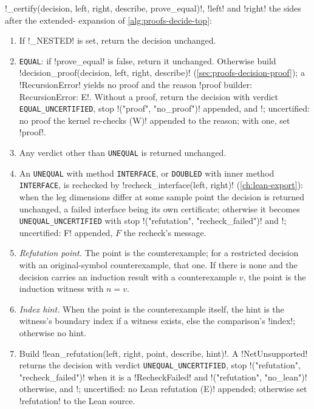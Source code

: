 \begin{algorithm}[Certification]\label{alg:proofs-certify}
\py!_certify(decision, left, right, describe, prove_equal)!, \py!left! and \py!right! the sides after the extended-\bbox{} expansion of \cref{alg:proofs-decide-top}:
\begin{enumerate}
\item If \py!_NESTED! is set, return the decision unchanged.
\item \texttt{EQUAL}: if \py!prove_equal! is false, return it unchanged. Otherwise build \py!decision_proof(decision, left, right, describe)! (\cref{sec:proofs-decision-proof}); a \py!RecursionError! yields no proof and the reason \code!proof builder: RecursionError: E!. Without a proof, return the decision with verdict \texttt{EQUAL\_UNCERTIFIED}, stop \code!("proof", "no_proof")! appended, and \code!; uncertified: no proof the kernel re-checks (W)! appended to the reason; with one, set \py!proof!.
\item Any verdict other than \texttt{UNEQUAL} is returned unchanged.
\item An \texttt{UNEQUAL} with method \texttt{INTERFACE}, or \texttt{DOUBLED} with inner method \texttt{INTERFACE}, is rechecked by \py!recheck_interface(left, right)! (\cref{ch:lean-export}): when the leg dimensions differ at some sample point the decision is returned unchanged, a failed interface being its own certificate; otherwise it becomes \texttt{UNEQUAL\_UNCERTIFIED} with stop \code!("refutation", "recheck_failed")! and \code!; uncertified: F! appended, $F$ the recheck's message.
\item \emph{Refutation point.} The point is the counterexample; for a restricted decision with an original-symbol counterexample, that one. If there is none and the decision carries an induction result with a counterexample $v$, the point is the induction witness with $n=v$.
\item \emph{Index hint.} When the point is the counterexample itself, the hint is the witness's boundary index if a witness exists, else the comparison's \py!index!; otherwise no hint.
\item Build \py!lean_refutation(left, right, point, describe, hint)!. A \py!NetUnsupported! returns the decision with verdict \texttt{UNEQUAL\_UNCERTIFIED}, stop \code!("refutation", "recheck_failed")! when it is a \py!RecheckFailed! and \code!("refutation", "no_lean")! otherwise, and \code!; uncertified: no Lean refutation (E)! appended; otherwise set \py!refutation! to the Lean source.
\end{enumerate}
\end{algorithm}

